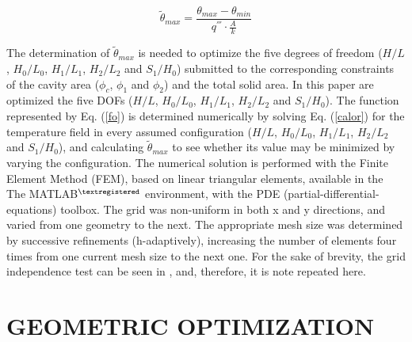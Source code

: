 \documentclass[12pt,fleqn]{article}
\begin{document}
\begin{equation}
\tilde{\theta}_{max}=\frac{\theta_{max}-\theta_{min}}{q^{'''}\cdot\frac{A}{k}}\label{fo}
\end{equation}

The determination of $\tilde{\theta}_{max}$ is needed to optimize the five degrees of freedom ($H/L$, $H_{0}/L_{0}$, $H_{1}/L_{1}$, $H_{2}/L_{2}$ and $S_{1}/H_{0}$) submitted to the corresponding constraints of the cavity area ($\phi_{c}$, $\phi_{1}$ and $\phi_{2}$) and the total solid area. In this paper are optimized the five DOFs ($H/L$, $H_{0}/L_{0}$, $H_{1}/L_{1}$, $H_{2}/L_{2}$ and $S_{1}/H_{0}$). The function represented by Eq. (\ref{fo}) is determined numerically by solving Eq. (\ref{calor}) for the temperature field in every assumed configuration ($H/L$, $H_{0}/L_{0}$, $H_{1}/L_{1}$, $H_{2}/L_{2}$ and $S_{1}/H_{0}$), and calculating $\tilde{\theta}_{max}$ to see whether its value may be minimized by varying the configuration. The numerical solution is performed with the Finite Element Method (FEM)\citep{Reddy1994}, based on linear triangular elements, available in the The MATLAB$^{\tiny ®}$ environment, with the PDE (partial-differential-equations) toolbox. The grid was non-uniform in both x and y directions, and varied from one geometry to the next. The appropriate mesh size was determined by successive refinements (h-adaptively), increasing the number of elements four times from one current mesh size to the next one. For the sake of brevity, the grid independence test can be seen in \cite{Gonzales2015b}, and, therefore, it is note repeated here.

\section{GEOMETRIC OPTIMIZATION}
\end{document}
